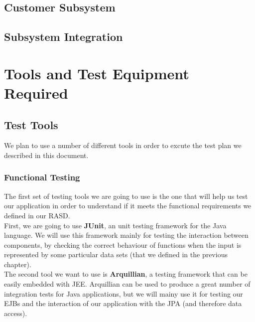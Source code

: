 \documentclass{article}
\begin{document}
\subsection{Customer Subsystem}







\subsection{Subsystem Integration}

\newpage

\section{Tools and Test Equipment Required}
\subsection{Test Tools}
We plan to use a number of different tools in order to excute the test plan we described in this document.
\subsubsection{Functional Testing}
The first set of testing tools we are going to use is the one that will help us test our application in order to understand  if it meets the functional requirements we defined in our RASD.
\\

First, we are going to use \textbf{JUnit}, an unit testing framework for the Java language. We will use this framework mainly for testing the interaction between components, by checking the correct behaviour of functions when the input is represented by some particular data sets (that we defined in the previous chapter).
\\

The second tool we want to use is \textbf{Arquillian}, a testing framework that can be easily embedded with JEE. Arquillian can be used to produce a great number of integration tests for Java applications, but we will mainy use it for testing our EJBs and the interaction of our application with the JPA (and therefore data access).
\end{document}
